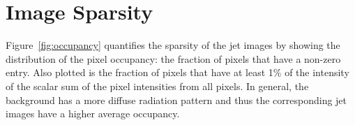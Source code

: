 \documentclass{article}
\begin{document}
%
%
%
%
%
%
%



%

%








\appendix

\clearpage
\newpage

\section{Image Sparsity}
\label{sec:sparsity}

Figure~\ref{fig:occupancy} quantifies the sparsity of the jet images by showing the distribution of the pixel occupancy: the fraction of pixels that have a non-zero entry.  Also plotted is the fraction of pixels that have at least 1\% of the intensity of the scalar sum of the pixel intensities from all pixels.  In general, the background has a more diffuse radiation pattern and thus the corresponding jet images have a higher average occupancy.
\end{document}
